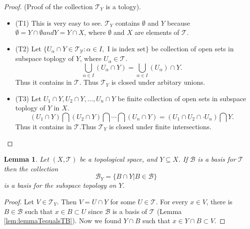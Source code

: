 \documentclass[
]{book}
\providecommand{\tightlist}{%
  \setlength{\itemsep}{0pt}\setlength{\parskip}{0pt}}
\newtheorem{lemma}{Lemma}[chapter]
\theoremstyle{definition}
\theoremstyle{definition}
\theoremstyle{definition}
\theoremstyle{definition}
\theoremstyle{remark}
\begin{document}
\begin{proof}

(Proof of the collection \(\mathcal{T}_Y\) is a tology).

\begin{itemize}
\tightlist
\item
  (T1) This is very easy to see. \(\mathcal{T}_Y\) contains \(\emptyset\) and \(Y\) because \(\emptyset = Y \cap \emptyset and Y = Y \cap X\), where \(\emptyset\) and \(X\) are elements of \(\mathcal{T}\).
\item
  (T2) Let \(\{U_\alpha \cap Y\in \mathcal{T_Y}:\alpha \in I, \text{ I is index set}\}\) be collection of open sets in subspace toplogy of \(Y\), where \(U_\alpha\in \mathcal{T}\).
  \[\bigcup_{\alpha \in I}\left(U_\alpha\cap Y\right)
    =\bigcup_{\alpha \in I}\left(U_\alpha\right)\cap Y.\]
  Thus it contains in \(\mathcal{T}\). Thus \(\mathcal{T}_Y\) is closed under arbitary unions.
\item
  (T3) Let \(U_1\cap Y, U_2\cap Y,..., U_n\cap Y\) be finite collection of open sets in subspace toplogy of \(Y\) in \(X\).
  \[(U_1\cap Y)\bigcap (U_2\cap Y)\bigcap \cdots \bigcap (U_n\cap Y)=(U_1\cap U_2 \cap \cdot U_n)\bigcap Y.\]
  Thus it contains in \(\mathcal{T}\).Thus \(\mathcal{T}_Y\) is closed under finite intersections.
\end{itemize}

\end{proof}

\begin{lemma}
\protect\hypertarget{lem:unnamed-chunk-44}{}\label{lem:unnamed-chunk-44}Let \((X, \mathcal{T})\) be a topological space, and \(Y\subseteq X\). If \(\mathcal{B}\) is a basis for \(\mathcal{T}\) then the collection
\[\mathcal{B}_Y = \{B \cap Y | B \in \mathcal{B}\}\]
is a basis for the subspace topology on \(Y\).
\end{lemma}

\begin{proof}
Let \(V\in \mathcal{T}_Y\). Then \(V=U\cap Y\) for some \(U\in \mathcal{T}\). For every \(x \in V\), there is \(B \in \mathcal{B}\) such that \(x \in B \subset U\) since \(\mathcal{B}\) is a basis of \(\mathcal{T}\) (Lemma \ref{lem:lemmaTequalsTB}). Now we found \(Y \cap B\) such that \(x \in Y \cap B \subset V\).
\end{proof}
\end{document}
